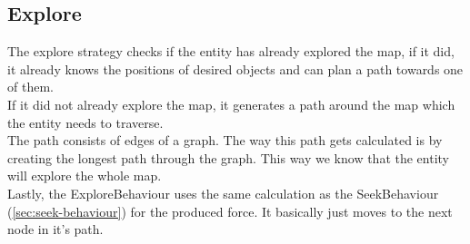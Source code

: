 \subsection{Explore}
\label{sec:explore}
The explore strategy checks if the entity has already explored the map, 
if it did, it already knows the positions of desired objects and can plan a 
path towards one of them. \\
If it did not already explore the map, it generates a path around the map 
which the entity needs to traverse. \\
The path consists of edges of a graph. The way this path gets calculated is 
by creating the longest path through the graph. This way we know that the 
entity will explore the whole map. \\
Lastly, the ExploreBehaviour uses the same calculation as the SeekBehaviour 
(\cref{sec:seek-behaviour}) for the produced force. It basically just moves to 
the next node in it's path.


